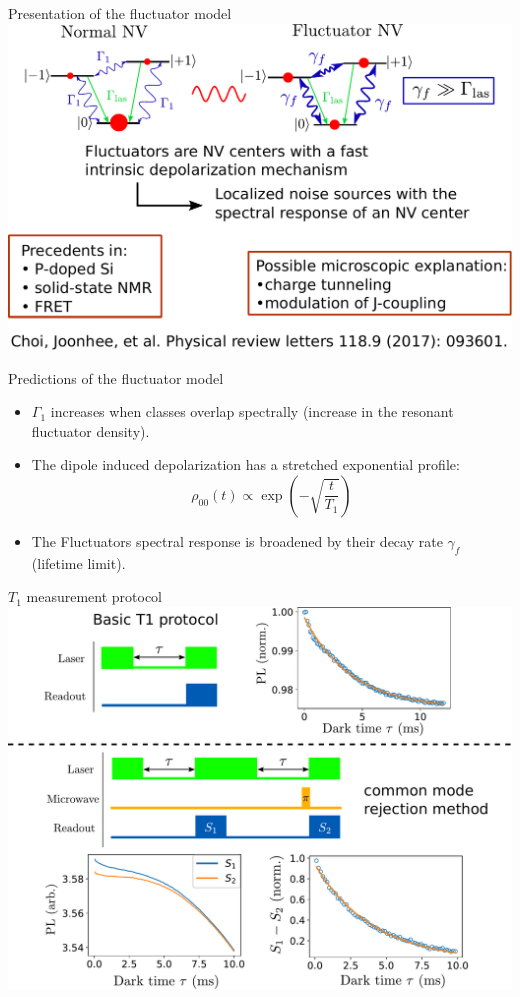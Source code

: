 \documentclass{beamer}
\begin{document}
\begin{frame}{Presentation of the fluctuator model}
\centering
\includegraphics[width=\textwidth,height=0.8\textheight,keepaspectratio]{Slide_fluct_intro}
\end{frame}

\begin{frame}{Predictions of the fluctuator model}
\begin{itemize}
\item $\Gamma_1$ increases when classes overlap spectrally (increase in the resonant fluctuator density).
\item The dipole induced depolarization has a stretched exponential profile:
$$ \rho_{00}(t) \propto \exp(-\sqrt{\frac{t}{T_1}})$$
\item The Fluctuators spectral response is broadened by their decay rate $\gamma_f$ (lifetime limit).
\end{itemize}
\end{frame}

\begin{frame}{$T_1$ measurement protocol}
\centering
\includegraphics[width=\textwidth,height=0.9\textheight,keepaspectratio]{slide_T1_protocol}
\end{frame}
\end{document}
